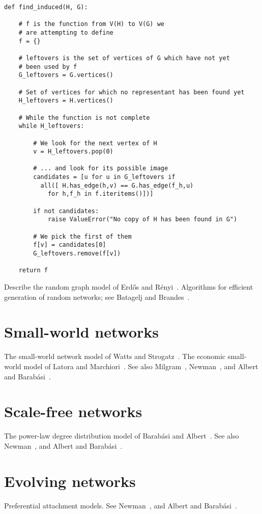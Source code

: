 \begin{lstlisting}
def find_induced(H, G):

    # f is the function from V(H) to V(G) we
    # are attempting to define
    f = {}

    # leftovers is the set of vertices of G which have not yet
    # been used by f
    G_leftovers = G.vertices()

    # Set of vertices for which no representant has been found yet
    H_leftovers = H.vertices()

    # While the function is not complete
    while H_leftovers:

        # We look for the next vertex of H
        v = H_leftovers.pop(0)

        # ... and look for its possible image
        candidates = [u for u in G_leftovers if
          all([ H.has_edge(h,v) == G.has_edge(f_h,u)
            for h,f_h in f.iteritems()])]

        if not candidates:
            raise ValueError("No copy of H has been found in G")

        # We pick the first of them
        f[v] = candidates[0]
        G_leftovers.remove(f[v])

    return f
\end{lstlisting}

Describe the random graph model of Erd\H{o}s and
R{\'e}nyi~\cite{ErdosRenyi1959}. Algorithms for efficient generation
of random networks; see Batagelj and
Brandes~\cite{BatageljBrandes2005}.



\section{Small-world networks}

The small-world network model of Watts and
Strogatz~\cite{WattsStrogatz1998}. The economic small-world model of
Latora and Marchiori~\cite{LatoraMarchiori2003}. See also
Milgram~\cite{Milgram1967}, Newman~\cite{Newman2003}, and Albert and
Barab{\'a}si~\cite{AlbertBarabasi2002}.



\section{Scale-free networks}

The power-law degree distribution model of Barab{\'a}si and
Albert~\cite{BarabasiAlbert1999}. See also Newman~\cite{Newman2003},
and Albert and Barab{\'a}si~\cite{AlbertBarabasi2002}.



\section{Evolving networks}

Preferential attachment models. See Newman~\cite{Newman2003},
and Albert and Barab{\'a}si~\cite{AlbertBarabasi2002}.
